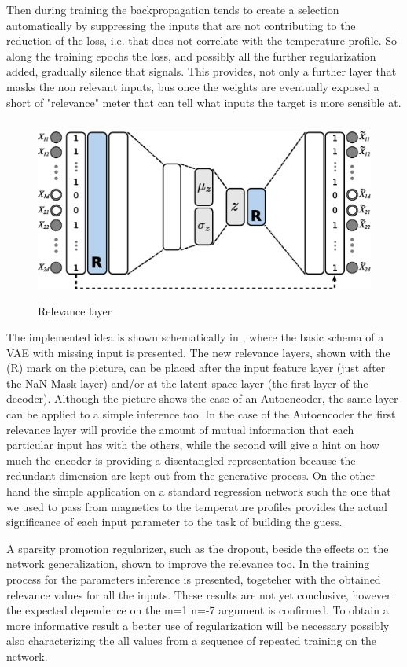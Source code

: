 Then during training the backpropagation tends to create a selection automatically by suppressing the inputs that are not contributing to the reduction of the loss, i.e. that does not correlate with the temperature profile.
So along the training epochs the loss, and possibly all the further regularization added, gradually silence that signals. This provides, not only a further layer that masks the non relevant inputs, bus once the weights are eventually exposed a short of "relevance" meter that can tell what inputs the target is more sensible at.
%
\begin{figure}
    \centering
    \includegraphics[height=6cm]{img/STEP12_7/VAE_RELEVANCE.eps}
    \caption{Relevance layer}
    \label{fig:relevance}
\end{figure}
%
The implemented idea is shown schematically in \Figure{\ref{fig:relevance}}, where the basic schema of a VAE with missing input is presented. The new relevance layers, shown with the (R) mark on the picture, can be placed after the input feature layer (just after the NaN-Mask layer) and/or at the latent space layer (the first layer of the decoder).
Although the picture shows the case of an Autoencoder, the same layer can be applied to a simple inference too.
In the case of the Autoencoder the first relevance layer will provide the amount of mutual information that each particular input has with the others, while the second will give a hint on how much the encoder is providing a disentangled representation because the redundant dimension are kept out from the generative process.
On the other hand the simple application on a standard regression network such the one that we used to pass from magnetics to the temperature profiles provides the actual significance of each input parameter to the task of building the guess.

A sparsity promotion regularizer, such as the dropout, beside the effects on the network generalization, shown to improve the relevance too.
In \Figure{\ref{fig:step_12_7_relevance}} the training process for the parameters inference is presented, togeteher with the obtained relevance values for all the inputs.
These results are not yet conclusive, however the expected dependence on the m=1 n=-7 argument is confirmed.
To obtain a more informative result a better use of regularization will be necessary possibly also characterizing the all values from a sequence of repeated training on the network.




